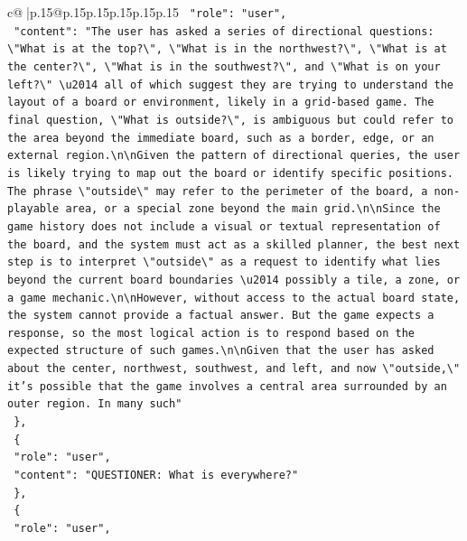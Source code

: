 \documentclass{article}
\begin{document}
{\begin{supertabular}{c@{$\;$}|p{.15\linewidth}@{}p{.15\linewidth}p{.15\linewidth}p{.15\linewidth}p{.15\linewidth}p{.15\linewidth}}
{{{\texttt{    "role": "user",} \\
\texttt{    "content": "The user has asked a series of directional questions: \textbackslash{}"What is at the top?\textbackslash{}", \textbackslash{}"What is in the northwest?\textbackslash{}", \textbackslash{}"What is at the center?\textbackslash{}", \textbackslash{}"What is in the southwest?\textbackslash{}", and \textbackslash{}"What is on your left?\textbackslash{}" \textbackslash{}u2014 all of which suggest they are trying to understand the layout of a board or environment, likely in a grid{-}based game. The final question, \textbackslash{}"What is outside?\textbackslash{}", is ambiguous but could refer to the area beyond the immediate board, such as a border, edge, or an external region.\textbackslash{}n\textbackslash{}nGiven the pattern of directional queries, the user is likely trying to map out the board or identify specific positions. The phrase \textbackslash{}"outside\textbackslash{}" may refer to the perimeter of the board, a non{-}playable area, or a special zone beyond the main grid.\textbackslash{}n\textbackslash{}nSince the game history does not include a visual or textual representation of the board, and the system must act as a skilled planner, the best next step is to interpret \textbackslash{}"outside\textbackslash{}" as a request to identify what lies beyond the current board boundaries \textbackslash{}u2014 possibly a tile, a zone, or a game mechanic.\textbackslash{}n\textbackslash{}nHowever, without access to the actual board state, the system cannot provide a factual answer. But the game expects a response, so the most logical action is to respond based on the expected structure of such games.\textbackslash{}n\textbackslash{}nGiven that the user has asked about the center, northwest, southwest, and left, and now \textbackslash{}"outside,\textbackslash{}" it's possible that the game involves a central area surrounded by an outer region. In many such"} \\
\texttt{  \},} \\
\texttt{  \{} \\
\texttt{    "role": "user",} \\
\texttt{    "content": "QUESTIONER: What is everywhere?"} \\
\texttt{  \},} \\
\texttt{  \{} \\
\texttt{    "role": "user",} \\
}}}
\end{supertabular}}
\end{document}
